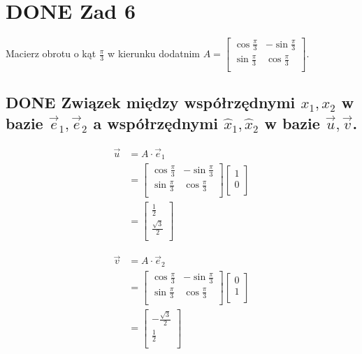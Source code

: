 \documentclass[11pt]{article}
\begin{document}
\section{{\bfseries\sffamily DONE} Zad 6}
\label{sec:orgdd8e4ad}
Macierz obrotu o kąt \(\displaystyle\frac{\pi}{3}\) w kierunku dodatnim
\(A = \begin{bmatrix}
\cos \frac{\pi}{3} & -\sin \frac{\pi}{3}\\
\sin \frac{\pi}{3} & \cos \frac{\pi}{3}\\
\end{bmatrix}\).
\subsection{{\bfseries\sffamily DONE} Związek między współrzędnymi \(x_1, x_2\) w bazie \(\vec{e}_1, \vec{e}_2\) a współrzędnymi \(\hat{x}_1, \hat{x}_2\) w bazie \(\vec{u}, \vec{v}\).}
\label{sec:org56b6398}
\begin{align*}
  \vec{u} &= A \cdot \vec e_{1}
  \\
          &=
            \begin{bmatrix}
              \cos \frac{\pi}{3} & -\sin \frac{\pi}{3}\\
              \sin \frac{\pi}{3} & \cos \frac{\pi}{3}\\
            \end{bmatrix}
  \begin{bmatrix}
    1 \\
    0 \\
  \end{bmatrix}
  \\
          &= \begin{bmatrix}
               \frac{1}{2}\\
               \frac{\sqrt{3}}{2}\\
             \end{bmatrix}
\end{align*}

\begin{align*}
  \vec{v} &= A \cdot \vec e_{2}
  \\
          &=
            \begin{bmatrix}
              \cos \frac{\pi}{3} & -\sin \frac{\pi}{3}\\
              \sin \frac{\pi}{3} & \cos \frac{\pi}{3}\\
            \end{bmatrix}
  \begin{bmatrix}
    0 \\
    1 \\
  \end{bmatrix}
  \\
          &= \begin{bmatrix}
               -\frac{\sqrt{3}}{2}\\
               \frac{1}{2}\\
             \end{bmatrix}
\end{align*}
\end{document}
